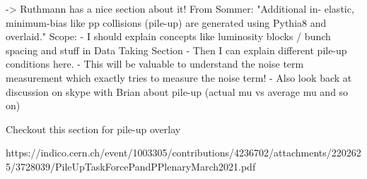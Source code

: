 ->  Ruthmann has a nice section about it!
From Sommer: "Additional in- elastic, minimum-bias like pp collisions (pile-up) are generated using Pythia8 and overlaid."
Scope:
- I should explain concepts like luminosity blocks  / bunch spacing and stuff in Data Taking Section
- Then I can explain different pile-up conditions here.
- This will be valuable to understand the noise term measurement which exactly tries to measure the noise term!
- Also look back at discussion on skype with Brian about pile-up (actual mu vs average mu and so on)

Checkout this section for pile-up overlay

https://indico.cern.ch/event/1003305/contributions/4236702/attachments/2202625/3728039/PileUpTaskForcePandPPlenaryMarch2021.pdf